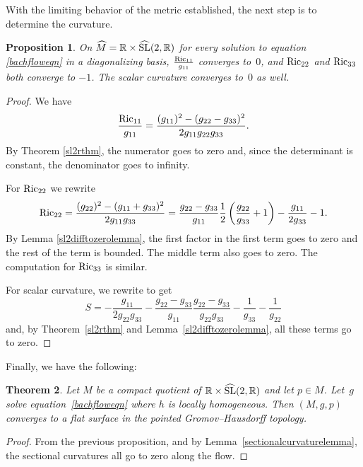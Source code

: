 \documentclass[10pt,a4paper]{amsart}
\numberwithin{equation}{section}
\newtheorem{Theorem}{Theorem}[section]
\newtheorem{Proposition}[Theorem]{Proposition}
 { \theoremstyle{definition}
\newtheorem{Definition}[Theorem]{Definition}
\newtheorem{Example}[Theorem]{Example}
\newtheorem{Remark}[Theorem]{Remark} }
\begin{document}
With the limiting behavior of the metric established, the next step is to determine the curvature.

\begin{Proposition}
On $\widehat{M} = \mathbb{R} \times \widehat{{\rm SL}}(2, \mathbb{R})$ for every solution to equation \eqref{bachfloweqn} in a diagonalizing basis, $\frac{{\rm Ric}_{11}}{g_{11}}$ converges to~$0$, and ${\rm Ric}_{22}$ and ${\rm Ric}_{33}$ both converge to $-1$. The scalar curvature converges to~$0$ as well.
\end{Proposition}

\begin{proof}We have
\[
\frac{{\rm Ric}_{11}}{g_{11}} = \frac{(g_{11})^2 - (g_{22} - g_{33})^2}{2 g_{11} g_{22} g_{33}}.
\]
By Theorem \ref{sl2rthm}, the numerator goes to zero and, since the determinant is constant, the denominator goes to infinity.

For ${\rm Ric}_{22}$ we rewrite
\begin{gather*}
{\rm Ric}_{22} = \frac{(g_{22})^2 - (g_{11} + g_{33})^2}{2 g_{11} g_{33}}
		= \frac{g_{22} - g_{33}}{g_{11}} \frac{1}{2}\left(\frac{g_{22}}{g_{33}} + 1 \right)
			- \frac{g_{11}}{2 g_{33}}
			- 1.
\end{gather*}
By Lemma \ref{sl2difftozerolemma}, the first factor in the first term goes to zero and the rest of the term is bounded. The middle term also goes to zero. The computation for ${\rm Ric}_{33}$ is similar.

For scalar curvature, we rewrite to get
\[
S = -\frac{g_{11}}{2 g_{22} g_{33}} - \frac{g_{22}
		- g_{33}}{g_{11}} \frac{g_{22} - g_{33}}{g_{22} g_{33}}
		- \frac{1}{g_{33}} - \frac{1}{g_{22}}
\]
and, by Theorem~\ref{sl2rthm} and Lemma~\ref{sl2difftozerolemma}, all these terms go to zero.
\end{proof}

Finally, we have the following:

\begin{Theorem}Let $M$ be a compact quotient of $\mathbb{R} \times \widehat{{\rm SL}}(2, \mathbb{R})$ and let $p \in M$. Let~$g$ solve equation~\eqref{bachfloweqn} where $h$ is locally homogeneous. Then $(M, g, p)$ converges to a flat surface in the pointed Gromov--Hausdorff topology.
\end{Theorem}

\begin{proof}From the previous proposition, and by Lemma~\ref{sectionalcurvaturelemma}, the sectional curvatures all go to zero along the flow.
 \end{proof}
\end{document}

